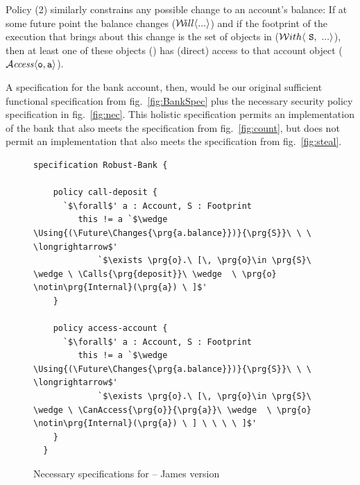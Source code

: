 Policy (2) similarly constrains any possible change to an 
account's balance: 
If at some future point the balance changes   (${\Future{...}}$) %
and if the footprint of the
execution that brings about this change is the set of objects in  (\ie $\Using{...}{\prg{S}}$), then 
at least one of these objects () has (direct) access to that account object
($\CanAccess{\prg{o}}{\prg{a}}$).


A  specification for the bank account, then,
would be our original sufficient functional specification from
fig.~\ref{fig:BankSpec} plus the necessary security policy
specification in fig.~\ref{fig:nec}.   
This holistic specification
permits an implementation of the bank that also meets the 
specification from fig.~\ref{fig:count}, but does not permit an
implementation that also meets the  specification from
fig.~\ref{fig:steal}.




\begin{figure}[tbp]
\begin{lstlisting}[escapeinside=`']
  specification Robust-Bank {

    policy call-deposit {
      `$\forall$' a : Account, S : Footprint
         this != a `$\wedge \Using{(\Future\Changes{\prg{a.balance}})}{\prg{S}}\ \ \ \longrightarrow$'
             `$\exists \prg{o}.\ [\, \prg{o}\in \prg{S}\ \wedge \ \Calls{\prg{deposit}}\ \wedge  \ \prg{o} \notin\prg{Internal}(\prg{a}) \ ]$'  
    }

    policy access-account {
      `$\forall$' a : Account, S : Footprint
         this != a `$\wedge \Using{(\Future\Changes{\prg{a.balance}})}{\prg{S}}\ \ \ \longrightarrow$'
             `$\exists \prg{o}.\ [\, \prg{o}\in \prg{S}\ \wedge \ \CanAccess{\prg{o}}{\prg{a}}\ \wedge  \ \prg{o} \notin\prg{Internal}(\prg{a}) \ ] \ \ \ \ ]$'
    }
  }
\end{lstlisting}
\caption{Necessary specifications for  -- James version}
\label{fig:kjx}
\end{figure}




